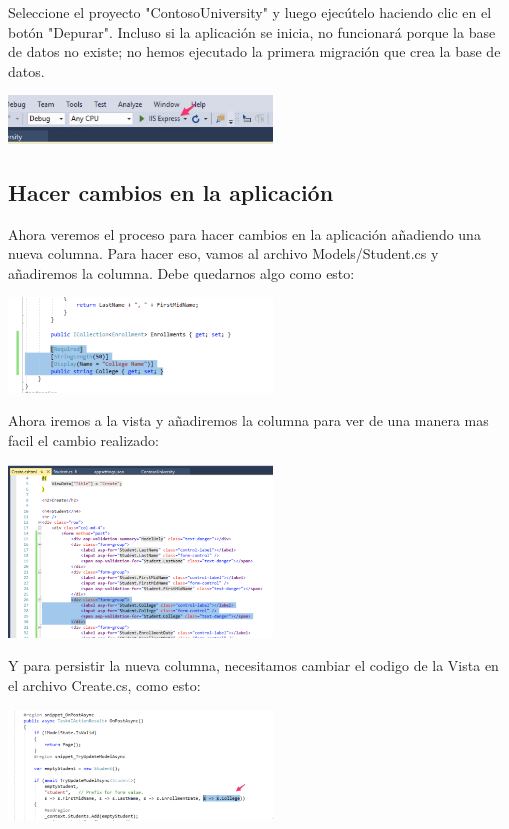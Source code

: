 \documentclass[twoside,twocolumn]{article}
\begin{document}
Seleccione el proyecto "ContosoUniversity" y luego ejecútelo haciendo clic en el botón "Depurar". Incluso si la aplicación se inicia, no funcionará porque la base de datos no existe; no hemos ejecutado la primera migración que crea la base de datos.
\begin{center}
	\includegraphics[width=7cm]{./Imagenes/proyecto4} 
	\end{center}

\subsection{Hacer cambios en la aplicación}
Ahora veremos el proceso para hacer cambios en la aplicación añadiendo una nueva columna. Para hacer eso, vamos al archivo Models/Student.cs y añadiremos la columna. Debe quedarnos algo como esto:
\begin{center}
	\includegraphics[width=7cm]{./Imagenes/cambios1} 
	\end{center}
Ahora iremos a la vista y añadiremos la columna para ver de una manera mas facil el cambio realizado:
\begin{center}
	\includegraphics[width=7cm]{./Imagenes/cambios2} 
	\end{center}
Y para persistir la nueva columna, necesitamos cambiar el codigo de la Vista en el archivo Create.cs, como esto:
\begin{center}
	\includegraphics[width=7cm]{./Imagenes/cambios3} 
	\end{center}
\end{document}
